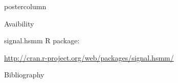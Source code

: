 \documentclass[final]{beamer}\usepackage[]{graphicx}\usepackage[]{color}
\begin{document}
\begin{frame}
\begin{columns}
\begin{column}{.52\textwidth}
\begin{beamercolorbox}[center,wd=\textwidth]{postercolumn}
\begin{minipage}[T]{.95\textwidth}
{\begin{block}{Avaibility}
{      signal.hsmm R package: 
      
      \url{http://cran.r-project.org/web/packages/signal.hsmm/}
        }
    \end{block}
    \vfill 
     
     
    \begin{block}{Bibliography}
    \tiny{
      
      
    }
    \end{block}
    \vfill
            }
        \end{minipage}
      \end{beamercolorbox}
    \end{column}
  \end{columns}  
\end{frame}
\end{document}
